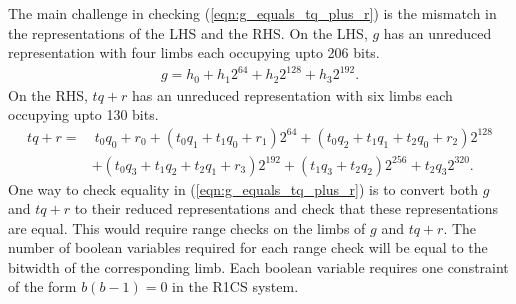 \documentclass[a4paper, 12pt]{article}
\begin{document}
The main challenge in checking (\ref{eqn:g_equals_tq_plus_r}) is the mismatch in the representations of the LHS and the RHS. On the LHS, $g$ has an unreduced representation with four limbs each occupying upto 206 bits.
\begin{align*}
   g = h_0 + h_1 2^{64} + h_2 2^{128} + h_3 2^{192}.
\end{align*}
On the RHS, $tq+r$ has an unreduced representation with six limbs each occupying upto 130 bits.
\begin{align*}
  tq+r  =&\ t_0q_0+r_0 + (t_0q_1 + t_1q_0 + r_1) 2^{64} + (t_0q_2 + t_1q_1 + t_2q_0 + r_2) 2^{128}\\
  & + (t_0q_3 + t_1q_2 + t_2q_1 + r_3) 2^{192}+ (t_1q_3 + t_2q_2) 2^{256} + t_2q_3 2^{320}.
\end{align*}
One way to check equality in (\ref{eqn:g_equals_tq_plus_r}) is to convert both $g$ and $tq+r$ to their reduced representations and check that these representations are equal. This would require range checks on the limbs of $g$ and $tq+r$. The number of boolean variables required for each range check will be equal to the bitwidth of the corresponding limb. Each boolean variable requires one constraint of the form $b(b-1) = 0$ in the R1CS system.
\end{document}

